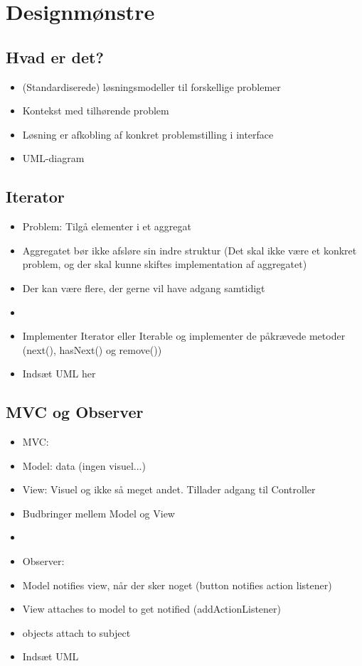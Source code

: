 \section{Designmønstre} %
\label{sec:designm_nstre}
\subsection{Hvad er det?} %
\label{sub:hvad_er_det_}
\begin{itemize}
    \item (Standardiserede) løsningsmodeller til forskellige problemer
    \item Kontekst med tilhørende problem
    \item Løsning er afkobling af konkret problemstilling i interface
    \item UML-diagram
\end{itemize}

\subsection{Iterator} %
\label{sub:iterator}
\begin{itemize}
    \item Problem: Tilgå elementer i et aggregat
    \item Aggregatet bør ikke afsløre sin indre struktur (Det skal ikke være et konkret problem, og der skal kunne skiftes implementation af aggregatet)
    \item Der kan være flere, der gerne vil have adgang samtidigt
    \item
    \item Implementer Iterator eller Iterable og implementer de påkrævede metoder (next(), hasNext() og remove())
    \item Indsæt UML her
\end{itemize}

\subsection{MVC og Observer} %
\label{sub:observer}
\begin{itemize}
    \item MVC:
    \item Model: data (ingen visuel...)
    \item View: Visuel og ikke så meget andet. Tillader adgang til Controller
    \item Budbringer mellem Model og View
    \item
    \item Observer:
    \item Model notifies view, når der sker noget (button notifies action listener)
    \item View attaches to model to get notified (addActionListener)
    \item objects attach to subject
    \item Indsæt UML
\end{itemize}

